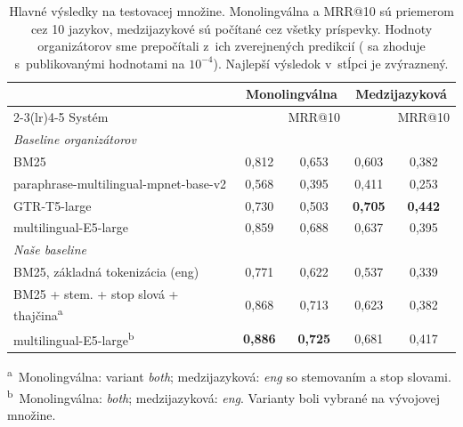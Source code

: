 \begin{table}[t]
\centering
\caption{Hlavné výsledky na testovacej množine. Monolingválna \sat{} a MRR@10 sú priemerom cez 10 jazykov, medzijazykové sú počítané cez všetky príspevky. Hodnoty organizátorov sme prepočítali z~ich zverejnených predikcií (\sat{} sa zhoduje s~publikovanými hodnotami na $10^{-4}$). Najlepší výsledok v~stĺpci je zvýraznený.}
\label{tab:main}
\begin{tabular}{lcccc}
\toprule
 & \multicolumn{2}{c}{Monolingválna} & \multicolumn{2}{c}{Medzijazyková} \\
\cmidrule(lr){2-3}\cmidrule(lr){4-5}
Systém & \sat{} & MRR@10 & \sat{} & MRR@10 \\
\midrule
\multicolumn{5}{l}{\emph{Baseline organizátorov}} \\
BM25 & 0{,}812 & 0{,}653 & 0{,}603 & 0{,}382 \\
paraphrase-multilingual-mpnet-base-v2 & 0{,}568 & 0{,}395 & 0{,}411 & 0{,}253 \\
GTR-T5-large & 0{,}730 & 0{,}503 & \textbf{0{,}705} & \textbf{0{,}442} \\
multilingual-E5-large & 0{,}859 & 0{,}688 & 0{,}637 & 0{,}395 \\
\midrule
\multicolumn{5}{l}{\emph{Naše baseline}} \\
BM25, základná tokenizácia (eng) & 0{,}771 & 0{,}622 & 0{,}537 & 0{,}339 \\
BM25 + stem. + stop slová + thajčina\textsuperscript{a} & 0{,}868 & 0{,}713 & 0{,}623 & 0{,}382 \\
multilingual-E5-large\textsuperscript{b} & \textbf{0{,}886} & \textbf{0{,}725} & 0{,}681 & 0{,}417 \\
\bottomrule
\end{tabular}

\smallskip
{\footnotesize \textsuperscript{a}~Monolingválna: variant \emph{both}; medzijazyková: \emph{eng} so stemovaním a stop slovami. \textsuperscript{b}~Monolingválna: \emph{both}; medzijazyková: \emph{eng}. Varianty boli vybrané na vývojovej množine.}
\end{table}
